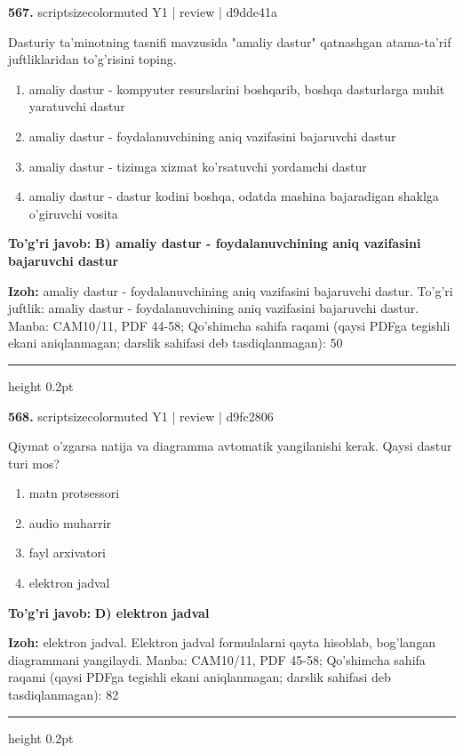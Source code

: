 \documentclass[10pt,a4paper]{article}
\begin{document}
{\bfseries\sffamily\color{ink} 567.} {scriptsizecolor{muted} Y1 | review | d9dde41a}
\par
Dasturiy ta'minotning tasnifi mavzusida "amaliy dastur" qatnashgan atama-ta'rif juftliklaridan to'g'risini toping.
\begin{enumerate}[label=\Alph*),leftmargin=9mm]
\item amaliy dastur - kompyuter resurslarini boshqarib, boshqa dasturlarga muhit yaratuvchi dastur
\item amaliy dastur - foydalanuvchining aniq vazifasini bajaruvchi dastur
\item amaliy dastur - tizimga xizmat ko'rsatuvchi yordamchi dastur
\item amaliy dastur - dastur kodini boshqa, odatda mashina bajaradigan shaklga o'giruvchi vosita
\end{enumerate}
\begin{tcolorbox}[enhanced,breakable,colback=teal!4,colframe=teal!60!black,boxrule=0.45pt,arc=1.2mm,left=2.7mm,right=2.7mm,top=1.8mm,bottom=1.8mm,before skip=2mm,after skip=2mm]
{\bfseries\sffamily\color{teal}To'g'ri javob:} \textbf{B) amaliy dastur - foydalanuvchining aniq vazifasini bajaruvchi dastur}
\par\smallskip
{\bfseries Izoh:} amaliy dastur - foydalanuvchining aniq vazifasini bajaruvchi dastur. To'g'ri juftlik: amaliy dastur - foydalanuvchining aniq vazifasini bajaruvchi dastur. Manba: CAM10/11, PDF 44-58; Qo'shimcha sahifa raqami (qaysi PDFga tegishli ekani aniqlanmagan; darslik sahifasi deb tasdiqlanmagan): 50
\end{tcolorbox}
\vspace{2mm}\hrule height 0.2pt\vspace{3mm}

{\bfseries\sffamily\color{ink} 568.} {scriptsizecolor{muted} Y1 | review | d9fc2806}
\par
Qiymat o'zgarsa natija va diagramma avtomatik yangilanishi kerak. Qaysi dastur turi mos?
\begin{enumerate}[label=\Alph*),leftmargin=9mm]
\item matn protsessori
\item audio muharrir
\item fayl arxivatori
\item elektron jadval
\end{enumerate}
\begin{tcolorbox}[enhanced,breakable,colback=teal!4,colframe=teal!60!black,boxrule=0.45pt,arc=1.2mm,left=2.7mm,right=2.7mm,top=1.8mm,bottom=1.8mm,before skip=2mm,after skip=2mm]
{\bfseries\sffamily\color{teal}To'g'ri javob:} \textbf{D) elektron jadval}
\par\smallskip
{\bfseries Izoh:} elektron jadval. Elektron jadval formulalarni qayta hisoblab, bog'langan diagrammani yangilaydi. Manba: CAM10/11, PDF 45-58; Qo'shimcha sahifa raqami (qaysi PDFga tegishli ekani aniqlanmagan; darslik sahifasi deb tasdiqlanmagan): 82
\end{tcolorbox}
\vspace{2mm}\hrule height 0.2pt\vspace{3mm}
\end{document}

